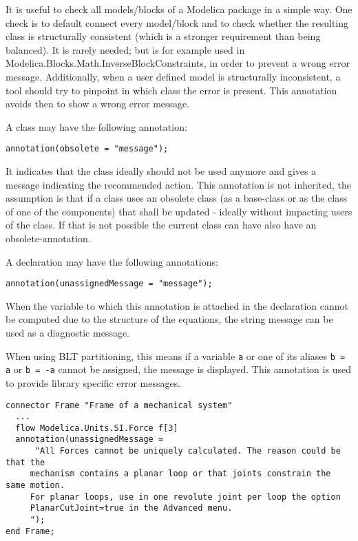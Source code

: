 \begin{nonnormative}
It is useful to check all models/blocks of a Modelica package
in a simple way. One check is to default connect every model/block and
to check whether the resulting class is structurally consistent (which is a
stronger requirement than being balanced). It is rarely needed; but is for
example used in Modelica.Blocks.Math.InverseBlockConstraints, in order
to prevent a wrong error message. Additionally, when a user defined
model is structurally inconsistent, a tool should try to pinpoint in
which class the error is present. This annotation avoids then to show a
wrong error message.
\end{nonnormative}

A class may have the following annotation:
\begin{lstlisting}[language=modelica]
annotation(obsolete = "message");
\end{lstlisting}

It indicates that the class ideally should not be used anymore and gives
a message indicating the recommended action.
This annotation is not inherited, the assumption is that if a class uses
an obsolete class (as a base-class or as the class of one of the components)
that shall be updated - ideally without impacting users of the class.
If that is not possible the current class can have also have an obsolete-annotation.

A declaration may have the following annotations:
\begin{lstlisting}[language=modelica]
annotation(unassignedMessage = "message");
\end{lstlisting}

When the variable to which this annotation is attached in the
declaration cannot be computed due to the structure of the equations,
the string message can be used as a diagnostic message.

\begin{nonnormative}
When using BLT partitioning, this means if a variable \lstinline!a! or one of its aliases \lstinline!b = a! or \lstinline!b = -a!
cannot be assigned, the message is displayed.  This annotation is used to provide library specific error messages.
\end{nonnormative}

\begin{example}
\begin{lstlisting}[language=modelica]
connector Frame "Frame of a mechanical system"
  ...
  flow Modelica.Units.SI.Force f[3]
  annotation(unassignedMessage =
      "All Forces cannot be uniquely calculated. The reason could be that the
     mechanism contains a planar loop or that joints constrain the same motion.
     For planar loops, use in one revolute joint per loop the option
     PlanarCutJoint=true in the Advanced menu.
     ");
end Frame;
\end{lstlisting}
\end{example}

